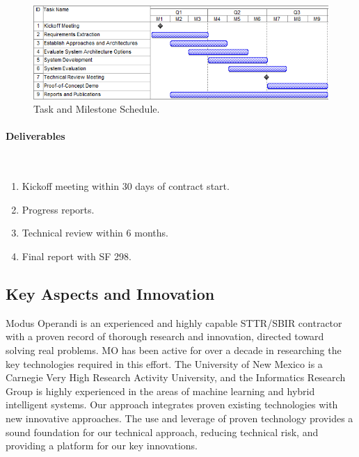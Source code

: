 \documentclass{sbir}
\begin{document}
\begin{figure}[h]
 \centerline{\includegraphics[width=5in]{./images/Gantt.png}}
 \caption{Task and Milestone Schedule.}
 \label{Gantt}
\end{figure}

\paragraph{Deliverables}~\\
\begin{enumerate}[label=\alph*.]
\item Kickoff meeting within 30 days of contract start.
\item Progress reports.
\item Technical review within 6 months.
\item Final report with SF 298.
\end{enumerate}


\newpage
\pagestyle{proprietary}

\subsection{Key Aspects and Innovation}
Modus Operandi is an experienced and highly capable STTR/SBIR contractor with a proven record of thorough research and innovation, directed toward solving real problems. MO has been active for over a decade in researching the key technologies required in this effort. The University of New Mexico is a Carnegie Very High Research Activity University, and the Informatics Research Group is highly experienced in the areas of machine learning and hybrid intelligent systems. Our approach integrates proven existing technologies with new innovative approaches. The use and leverage of proven technology provides a sound foundation for our technical approach, reducing technical risk, and providing a platform for our key innovations.
\end{document}
